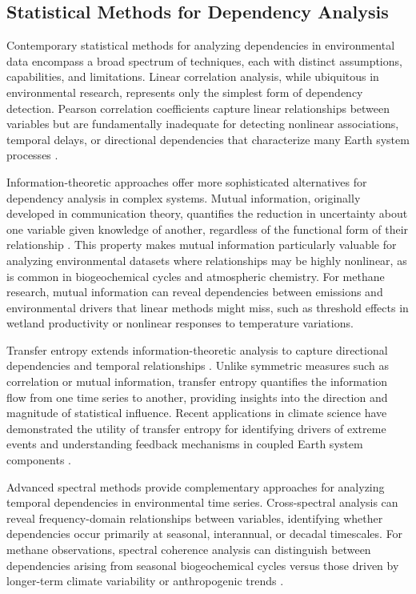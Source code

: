 \subsection{Statistical Methods for Dependency Analysis}

Contemporary statistical methods for analyzing dependencies in environmental data encompass a broad spectrum of techniques, each with distinct assumptions, capabilities, and limitations. Linear correlation analysis, while ubiquitous in environmental research, represents only the simplest form of dependency detection. Pearson correlation coefficients capture linear relationships between variables but are fundamentally inadequate for detecting nonlinear associations, temporal delays, or directional dependencies that characterize many Earth system processes \cite{Kraskov2004}.

Information-theoretic approaches offer more sophisticated alternatives for dependency analysis in complex systems. Mutual information, originally developed in communication theory, quantifies the reduction in uncertainty about one variable given knowledge of another, regardless of the functional form of their relationship \cite{Kraskov2004}. This property makes mutual information particularly valuable for analyzing environmental datasets where relationships may be highly nonlinear, as is common in biogeochemical cycles and atmospheric chemistry. For methane research, mutual information can reveal dependencies between emissions and environmental drivers that linear methods might miss, such as threshold effects in wetland productivity or nonlinear responses to temperature variations.

Transfer entropy extends information-theoretic analysis to capture directional dependencies and temporal relationships \cite{Schreiber2000}. Unlike symmetric measures such as correlation or mutual information, transfer entropy quantifies the information flow from one time series to another, providing insights into the direction and magnitude of statistical influence. Recent applications in climate science have demonstrated the utility of transfer entropy for identifying drivers of extreme events and understanding feedback mechanisms in coupled Earth system components \cite{Palus2024, li_integrating_2025}.

Advanced spectral methods provide complementary approaches for analyzing temporal dependencies in environmental time series. Cross-spectral analysis can reveal frequency-domain relationships between variables, identifying whether dependencies occur primarily at seasonal, interannual, or decadal timescales. For methane observations, spectral coherence analysis can distinguish between dependencies arising from seasonal biogeochemical cycles versus those driven by longer-term climate variability or anthropogenic trends \cite{tongal_forecasting_2021}.

